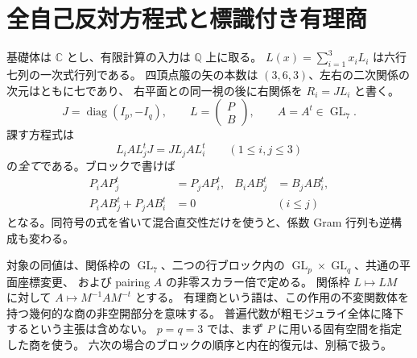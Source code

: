 \section{全自己反対方程式と標識付き有理商}
\label{sec:prym-setup-v26}
基礎体は $\mathbb C$ とし、有限計算の入力は $\mathbb Q$ 上に取る。
$L(x)=\sum_{i=1}^3x_iL_i$ は六行七列の一次式行列である。
四頂点箙の矢の本数は $(3,6,3)$、左右の二次関係の次元はともに七であり、
右平面との同一視の後に右関係を $R_i=JL_i$ と書く。
\[
 J=\operatorname{diag}(I_p,-I_q),\qquad
 L=\begin{pmatrix}P\\B\end{pmatrix},\qquad A=A^t\in\operatorname{GL}_7.
\]
課す方程式は
\begin{equation}\label{eq:full-incidence-v26}
 L_iAL_j^tJ=JL_jAL_i^t\qquad(1\leq i,j\leq3)
\end{equation}
の\emph{全て}である。ブロックで書けば
\begin{align*}
 P_iAP_j^t&=P_jAP_i^t,& B_iAB_j^t&=B_jAB_i^t,\\
 P_iAB_j^t+P_jAB_i^t&=0 &&(i\leq j)
\end{align*}
となる。同符号の式を省いて混合直交性だけを使うと、係数 Gram 行列も逆構成も変わる。

対象の同値は、関係枠の $\operatorname{GL}_7$、二つの行ブロック内の
$\operatorname{GL}_p\times\operatorname{GL}_q$、共通の平面座標変更、
および pairing $A$ の非零スカラー倍で定める。
関係枠 $L\mapsto LM$ に対して $A\mapsto M^{-1}AM^{-t}$ とする。
有理商という語は、この作用の不変関数体を持つ幾何的な商の非空開部分を意味する。
普遍代数が粗モジュライ全体に降下するという主張は含めない。
$p=q=3$ では、まず $P$ に用いる固有空間を指定した商を使う。
六次の場合のブロックの順序と内在的復元は、別稿\cite{PaperVII}で扱う。

